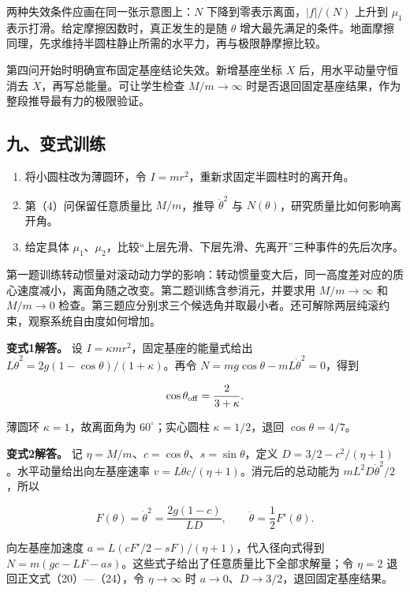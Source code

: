 \documentclass[12pt,a4paper,UTF8]{ctexart}
\newcommand{\tightlist}{\setlength{\itemsep}{0pt}\setlength{\parskip}{0pt}}
\begin{document}
两种失效条件应画在同一张示意图上：\(N\) 下降到零表示离面，\(|f|/(N)\)
上升到 \(\mu_1\) 表示打滑。给定摩擦因数时，真正发生的是随 \(\theta\)
增大最先满足的条件。地面摩擦同理，先求维持半圆柱静止所需的水平力，再与极限静摩擦比较。

第四问开始时明确宣布固定基座结论失效。新增基座坐标 \(X\)
后，用水平动量守恒消去 \(\dot X\)，再写总能量。可让学生检查
\(M/m\to\infty\) 时是否退回固定基座结果，作为整段推导最有力的极限验证。

\subsection{九、变式训练}\label{ux4e5dux53d8ux5f0fux8badux7ec3-1}

\begin{enumerate}
\def\labelenumi{\arabic{enumi}.}
\tightlist
\item
  将小圆柱改为薄圆环，令 \(I=mr^2\)，重新求固定半圆柱时的离开角。
\item
  第（4）问保留任意质量比 \(M/m\)，推导 \(\dot\theta^2\) 与
  \(N(\theta)\)，研究质量比如何影响离开角。
\item
  给定具体
  \(\mu_1\)、\(\mu_2\)，比较``上层先滑、下层先滑、先离开''三种事件的先后次序。
\end{enumerate}

第一题训练转动惯量对滚动动力学的影响：转动惯量变大后，同一高度差对应的质心速度减小，离面角随之改变。第二题训练含参消元，并要求用
\(M/m\to\infty\) 和 \(M/m\to0\)
检查。第三题应分别求三个候选角并取最小者。还可解除两层纯滚约束，观察系统自由度如何增加。

\textbf{变式1解答。} 设 \(I=\kappa mr^2\)，固定基座的能量式给出
\(L\dot\theta^2=2g(1-\cos\theta)/(1+\kappa)\)。再令
\(N=mg\cos\theta-mL\dot\theta^2=0\)，得到

\[\cos\theta_{\rm off}=\frac2{3+\kappa}.\]

薄圆环 \(\kappa=1\)，故离面角为 \(60^\circ\)；实心圆柱
\(\kappa=1/2\)，退回 \(\cos\theta=4/7\)。

\textbf{变式2解答。} 记
\(\eta=M/m\)、\(c=\cos\theta\)、\(s=\sin\theta\)，定义
\(D=3/2-c^2/(\eta+1)\)。水平动量给出向左基座速率
\(v=L\dot\theta c/(\eta+1)\)。消元后的总动能为
\(mL^2D\dot\theta^2/2\)，所以

\[F(\theta)=\dot\theta^2=\frac{2g(1-c)}{LD},\qquad \ddot\theta=\frac12F'(\theta).\]

向左基座加速度 \(a=L(cF'/2-sF)/(\eta+1)\)，代入径向式得到
\(N=m(gc-LF-as)\)。这些式子给出了任意质量比下全部求解量；令 \(\eta=2\)
退回正文式（20）---（24），令 \(\eta\to\infty\) 时
\(a\to0\)、\(D\to3/2\)，退回固定基座结果。
\end{document}
